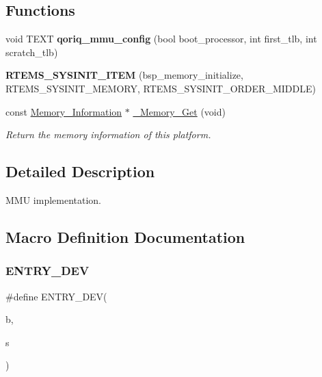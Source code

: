 \subsection*{Functions}
\begin{DoxyCompactItemize}
\item 
void T\+E\+XT {\bfseries qoriq\+\_\+mmu\+\_\+config} (bool boot\+\_\+processor, int first\+\_\+tlb, int scratch\+\_\+tlb)
\item 
\mbox{\label{powerpc_2qoriq_2start_2mmu-config_8c_ac37be686aea12354fe54d5fea6ad491d}} 
{\bfseries R\+T\+E\+M\+S\+\_\+\+S\+Y\+S\+I\+N\+I\+T\+\_\+\+I\+T\+EM} (bsp\+\_\+memory\+\_\+initialize, R\+T\+E\+M\+S\+\_\+\+S\+Y\+S\+I\+N\+I\+T\+\_\+\+M\+E\+M\+O\+RY, R\+T\+E\+M\+S\+\_\+\+S\+Y\+S\+I\+N\+I\+T\+\_\+\+O\+R\+D\+E\+R\+\_\+\+M\+I\+D\+D\+LE)
\item 
const \mbox{\hyperlink{structMemory__Information}{Memory\+\_\+\+Information}} $\ast$ \mbox{\hyperlink{group__RTEMSScoreMemory_gaec9f82588542ae89940517c48f0208f6}{\+\_\+\+Memory\+\_\+\+Get}} (void)
\begin{DoxyCompactList}\small\item\em Return the memory information of this platform. \end{DoxyCompactList}\end{DoxyCompactItemize}


\subsection{Detailed Description}
M\+MU implementation. 



\subsection{Macro Definition Documentation}
\mbox{\label{powerpc_2qoriq_2start_2mmu-config_8c_ac6cb1d2026e9c5f08f17d717ec9a12a9}} 
\subsubsection{\texorpdfstring{ENTRY\_DEV}{ENTRY\_DEV}}
{\footnotesize\ttfamily \#define E\+N\+T\+R\+Y\+\_\+\+D\+EV(\begin{DoxyParamCaption}\item[{}]{b,  }\item[{}]{s }\end{DoxyParamCaption})}

